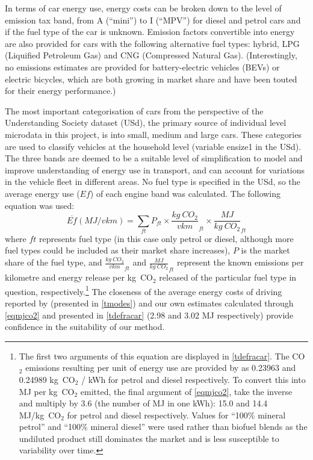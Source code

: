 In terms of car energy use,
energy costs can be broken down to the level of
emission tax band, from A (``mini'') to I (``MPV'') for diesel and petrol
cars and if the fuel type of the car is unknown. Emission factors
convertible into energy are also provided for cars with the following
alternative fuel types: hybrid, LPG (Liquified Petroleum Gas)
and CNG (Compressed Natural Gas). (Interestingly, no emissions estimates
are provided for battery-electric vehicles (BEVs) or electric
bicycles, which are both growing in market share and have been touted for
their energy performance.) 

The most important categorisation of cars from the perspective of the Understanding
Society dataset (USd), the primary source of individual level microdata in this project,
is into small, medium and large cars. These categories are used
to classify vehicles at the household level (variable ensize1 in the USd).
The three bands are deemed to be a suitable level of simplification to model and improve
understanding of energy use in transport, and can account for variations
in the vehicle fleet in different areas. No fuel type is specified in
the USd, so the average energy use ($Ef$) of each engine band was calculated.
The following equation was used:
\begin{equation}
\overline{Ef} (MJ/vkm) = \displaystyle{\sum_{ft}}
P_{ft} \times
\frac{kg~CO_{2}}{vkm}_{ft} \times \frac{MJ}{kg~CO_2}_{ft}
\label{eqmjco2}
\end{equation}
where $ft$ represents fuel type (in this case only petrol or diesel, although
more fuel types could be included as their market share increases), $P$ is the
market share of the fuel type, and $\frac{kg~CO_{2}}{vkm}_{ft}$ and $\frac{MJ}{kg~CO_2}_{ft}$
represent the known emissions per kilometre and energy release per kg~CO$_2$ released
of the particular fuel type in question,
respectively.\footnote{The
first two arguments of this equation are displayed
in \cref{tdefracar}. The CO$_2$ emissions resulting per unit of energy use
are provided by \citep[Table 1c]{Defra2011} as 0.23963 and 0.24989
kg~CO$_2$ / kWh for petrol and diesel respectively. To convert this into
MJ per kg~CO$_2$ emitted, the final argument of \cref{eqmjco2}, take the inverse
and multiply by 3.6 (the number of MJ in one kWh): 15.0 and 14.4 MJ/kg~CO$_2$
for petrol and diesel respectively. Values for ``100\% mineral petrol''
and ``100\% mineral diesel''
were used rather than biofuel blends as the undiluted product still dominates
the market and is less susceptible to variability over time.
}
The closeness of the average energy costs of driving reported by \citet{MacKay2009}
(presented in \cref{tmodes}) and our own estimates calculated through \cref{eqmjco2}
and presented in \cref{tdefracar} (2.98 and 3.02 MJ respectively) provide confidence
in the suitability of our method.
 

